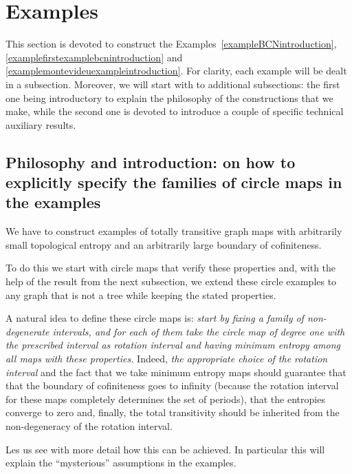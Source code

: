 \documentclass[a4paper, 11pt]{amsart}
\numberwithin{equation}{section}
\theoremstyle{customnumberedtheorem}
\theoremstyle{definitionwithbfnote}
\begin{document}

\section{Examples}\label{sectionexamples}
This section is devoted to construct the
Examples~\ref{exampleBCNintroduction},
         \ref{examplefirstexamplebcnintroduction} and
         \ref{examplemontevideuexampleintroduction}.
For clarity, each example will be dealt in a subsection.
Moreover, we will start with to additional subsections: the first one
being introductory to explain the philosophy of the constructions that
we make, while the second one is devoted to introduce a couple of
specific technical auxiliary results.

\subsection{Philosophy and introduction:
on how to explicitly specify the families of circle maps in the
examples}\label{Examples:PhilandIntro-HowTo}
We have to construct examples of totally transitive graph maps
with arbitrarily small topological entropy and an arbitrarily
large boundary of cofiniteness.

To do this we start with circle maps that verify these properties
and, with the help of the result from the next subsection,
we extend these circle examples to any graph that is not a tree while
keeping the stated properties.

A natural idea to define these circle maps is:
\emph{start by fixing a family of
non-degenerate intervals, and for each of them take the circle map of
degree one with the prescribed interval as rotation interval and
having minimum entropy among all maps with these properties.}
Indeed, \emph{the appropriate choice of the rotation interval}
and the fact that we take minimum entropy maps
should guarantee that that the boundary of cofiniteness goes to infinity
(because the rotation interval for these maps completely determines the set of periods),
that the entropies converge to zero and, finally, the total
transitivity should be inherited from the non-degeneracy of the
rotation interval.

Les us see with more detail how this can be achieved.
In particular this will explain the ``mysterious'' assumptions in the
examples.
\end{document}
